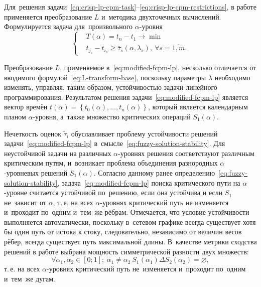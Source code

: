 Для~решения задачи~\eqref{eq:crisp-lp-cpm-task}--\eqref{eq:crisp-lp-cpm-restrictions}, в работе применяется преобразование $L$ и~методика двухточечных вычислений. Формулируется задача для~произвольного $\alpha$-уровня
\begin{equation}
\label{eq:modified-fcpm-lp}
  \left\{ \begin{aligned}
    & T(\alpha )=t_n-t_1\to \min  \\ 
    & t_{j_s}-t_{i_s}\geqslant \bar{\tau}_s\left(\alpha,\lambda_s \right),\ \forall s=\overline{1,m}.
  \end{aligned} \right.
\end{equation}

Преобразование $L$, применяемое в~\eqref{eq:modified-fcpm-lp}, несколько отличается от вводимого формулой~\eqref{eq:L-transform-base}, поскольку параметры $\lambda$ необходимо изменять, управляя, таким образом, устойчивостью задачи линейного программирования. Результатом решения задачи~\eqref{eq:modified-fcpm-lp} является вектор времён $t\left( \alpha \right)=\left\{ t_0\left(\alpha\right),\ldots,t_n\left(\alpha \right) \right\}$, который является календарным планом $\alpha$-уровня, а~также множество критических операций $S_1\left( \alpha \right)$.

Нечеткость оценок $\tilde{\tau}_i$ обуславливает проблему устойчивости решений задачи~\eqref{eq:modified-fcpm-lp} в~смысле~\eqref{eq:fuzzy-solution-stability}. Для неустойчивой задачи на различных $\alpha$-уровнях решения соответствуют различным критическим путям, и~возникает проблема объединения разнородных $\alpha$-уровневых решений $S_1\left(\alpha \right)$. Согласно данному ранее определению~\eqref{eq:fuzzy-solution-stability}, задача~\eqref{eq:modified-fcpm-lp} поиска критического пути на $\alpha$-уровне считается устойчивой по~решению, если она устойчива и если $S_1$ не~зависит от $\alpha$, т.\,е. на всех $\alpha$-уровнях критический путь не изменяется и~проходит по~одним и~тем~же рёбрам. Отмечается, что условие устойчивости выполняется автоматически, поскольку в~сетевом графике всегда существует хотя бы один путь от истока к стоку, следовательно, независимо от величин весов рёбер, всегда существует путь максимальной длины. В~качестве метрики сходства решений в работе выбрана мощность симметрической разности двух множеств:
\begin{equation}
\label{eq:modified-cpm-lp-stability}
  \forall \alpha_1, \alpha_2\in \left[ 0;1 \right];\ \alpha_1\ne \alpha_2\ S_1\left(\alpha_1 \right)\Delta S_2\left(\alpha_2 \right)=\varnothing,
\end{equation}
т.\,е. на всех $\alpha $-уровнях критический путь не~изменяется и~проходит по~одним и~тем~же дугам. 

